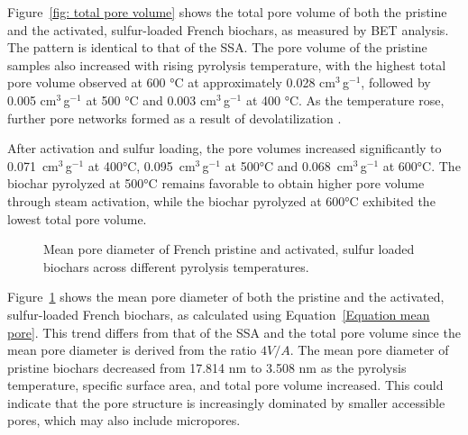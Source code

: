 Figure~\ref{fig: total pore volume} shows the total pore volume of both the pristine and the activated, sulfur-loaded French biochars, as measured by BET analysis. The pattern is identical to that of the SSA. The pore volume of the pristine samples also increased with rising pyrolysis temperature, with the highest total pore volume observed at 600 °C at approximately 0.028 cm$^3$\,g$^{-1}$, followed by 0.005 cm$^3$\,g$^{-1}$ at 500 °C and 0.003 cm$^3$\,g$^{-1}$ at 400 °C. As the temperature rose, further pore networks formed as a result of devolatilization \parencite{tomczyk-2020,ghorbani-2022}.
\vspace{0.3em}

After activation and sulfur loading, the pore volumes increased significantly to 0.071~cm$^3$\,g$^{-1}$ at 400°C, 0.095~cm$^3$\,g$^{-1}$ at 500°C and 0.068~cm$^3$\,g$^{-1}$ at 600°C. The biochar pyrolyzed at 500°C remains favorable to obtain higher pore volume through steam activation, while the biochar pyrolyzed at 600°C exhibited the lowest total pore volume.

\vspace{0.3em}

\begin{figure}[H]
\centering
{}
\caption{Mean pore diameter of French pristine and activated, sulfur loaded biochars across different pyrolysis temperatures.}
\label{fig: mean pore}
\end{figure}

Figure~\ref{fig: mean pore} shows the mean pore diameter of both the pristine and the activated, sulfur-loaded French biochars, as calculated using Equation~\ref{Equation mean pore}. This trend differs from that of the SSA and the total pore volume since the mean pore diameter is derived from the ratio \(4V/A\). The mean pore diameter of pristine biochars decreased from 17.814 nm to 3.508 nm as the pyrolysis temperature, specific surface area, and total pore volume increased. This could indicate that the pore structure is increasingly dominated by smaller accessible pores, which may also include micropores. 

